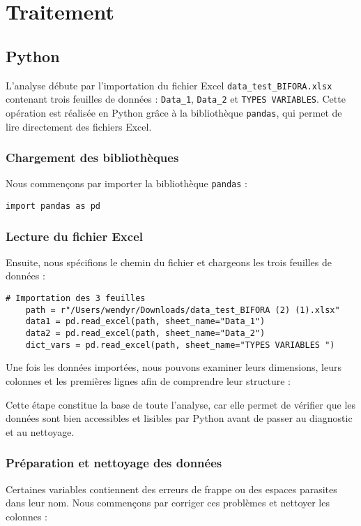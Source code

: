 \section{Traitement}

\subsection{Python}

L'analyse débute par l'importation du fichier Excel \texttt{data\_test\_BIFORA.xlsx} contenant trois feuilles de données : 
\texttt{Data\_1}, \texttt{Data\_2} et \texttt{TYPES VARIABLES}. 
Cette opération est réalisée en Python grâce à la bibliothèque \texttt{pandas}, qui permet de lire directement des fichiers Excel.

\subsubsection{Chargement des bibliothèques}
Nous commençons par importer la bibliothèque \texttt{pandas} :

\begin{lstlisting}[caption=Importation bibliothèque Pandas]
import pandas as pd
\end{lstlisting}


\subsubsection{Lecture du fichier Excel}
Ensuite, nous spécifions le chemin du fichier et chargeons les trois feuilles de données :

\begin{lstlisting}[caption=Importation du fichier Excel]
    # Importation des 3 feuilles
    path = r"/Users/wendyr/Downloads/data_test_BIFORA (2) (1).xlsx"
    data1 = pd.read_excel(path, sheet_name="Data_1")
    data2 = pd.read_excel(path, sheet_name="Data_2")
    dict_vars = pd.read_excel(path, sheet_name="TYPES VARIABLES ")
    \end{lstlisting}

Une fois les données importées, nous pouvons examiner leurs dimensions, leurs colonnes et les premières lignes afin de comprendre leur structure :


Cette étape constitue la base de toute l'analyse, car elle permet de vérifier que les données sont bien accessibles et lisibles par Python avant de passer au diagnostic et au nettoyage.
\subsubsection{Préparation et nettoyage des données}
Certaines variables contiennent des erreurs de frappe ou des espaces parasites dans leur nom. Nous commençons par corriger ces problèmes et nettoyer les colonnes :

